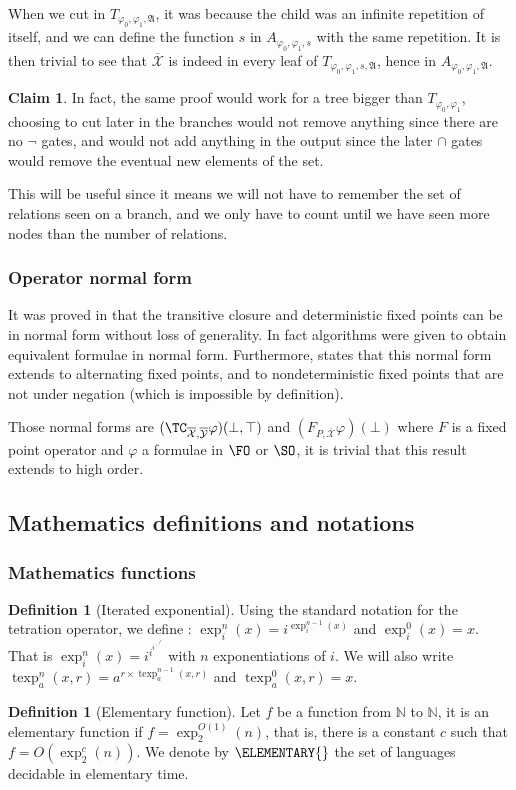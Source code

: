 \documentclass[a4paper,12pt]{article}
\newcommand{\sss}[1]{\subsubsection{#1}}
\theoremstyle{definition}
\newtheorem{definition}[theorem]{Definition}
\newtheorem{claim}[theorem]{Claim}
\DeclareMathOperator{\texp}{texp}
\renewcommand{\phi}{\varphi}
\newcommand{\N}{\ensuremath{\mathbb N}}
\newcommand{\mf}{\mathfrak}
\newcommand{\olmc}[1]{\overline{\mathcal{#1}}}
\begin{document}
When we cut in $T_{\phi_{0},\phi_{1},\mf A}$, it was because the child
was an infinite repetition of itself, and we  can define the
function $s$ in $A_{\phi_{0},\phi_{1},s}$ with the same repetition. It
is then trivial to see that $\olmc X$ is indeed in every leaf of
$T_{\phi_{0},\phi_{1},s,\mf A}$, hence in $A_{\phi_{0},\phi_{1},\mf
  A}$.
\begin{claim}\label{AFP}
  In fact, the same proof would work for a tree bigger than
  $T_{\phi_{0},\phi_{1}}$, choosing to cut later in the branches would not
  remove anything since there are no $\neg$ gates, and would not add
  anything in the output since the later $\cap$ gates would remove the
  eventual new elements of the set.
\end{claim}
This will be useful since it means we will not have to remember the
set of relations seen on a branch, and we only have to count until we
have seen more nodes than the number of relations.

\sss{Operator normal form}\label{opnorm}

It was proved in \cite{imm} that the transitive closure and
deterministic fixed points can be in normal form without loss of
generality. In fact algorithms were given to obtain equivalent formulae
in normal form. Furthermore, \cite{nfp} states that this normal form extends to
alternating fixed points, and to nondeterministic fixed points that
are not under negation (which is impossible by definition).

Those normal forms are $(\TC_{\olmc X,\olmc Y}\phi)(\bot,\top)$ and
$(F_{P,\olmc X}\phi)(\bot)$ where $F$ is a fixed point operator and
$\phi$ a formulae in $\FO$ or $\SO$, it is trivial that this result
extends to high order.

\subsection{Mathematics definitions and notations}

\sss{Mathematics functions}
\begin{definition}[Iterated exponential] Using the standard notation for the tetration operator, we define :
  $\exp_i^n(x)=i^{\exp_i^{n-1}(x)}$ and $\exp_i^0(x)=x$. That is
  $\exp_i^n(x)=i^{i^{i^{\dots^{i^{x}}}}}$ with $n$ exponentiations of
  $i$.
We will also write $\texp_a^n(x,r)=a^{r\times\texp_a^{n-1}(x,r)}$
  and $\texp_a^0(x,r)=x$.
\end{definition}

\begin{definition}[Elementary function]
  Let $f$ be a function from $\N$ to $\N$, it is an elementary
  function if $f= \exp_{2}^{O(1)}(n)$, that is, there is a constant
  $c$ such that $f=O(\exp_{2}^{c}(n))$. We denote by $\ELEMENTARY{}$ the
  set of languages decidable in elementary time.
\end{definition}
\end{document}
